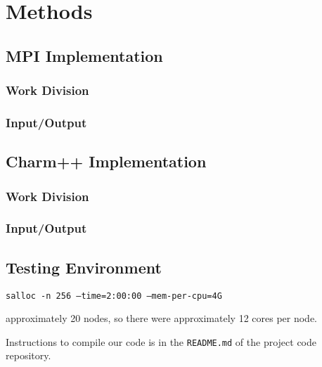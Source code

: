 \section{Methods}

\subsection{MPI Implementation}

\subsubsection{Work Division}

\subsubsection{Input/Output}

\subsection{Charm++ Implementation}

\subsubsection{Work Division}

\subsubsection{Input/Output}

\subsection{Testing Environment}

\texttt{salloc -n 256 --time=2:00:00 --mem-per-cpu=4G}

approximately 20 nodes, so there were approximately 12 cores per node.

Instructions to compile our code is in the \texttt{README.md} of the project code repository.
